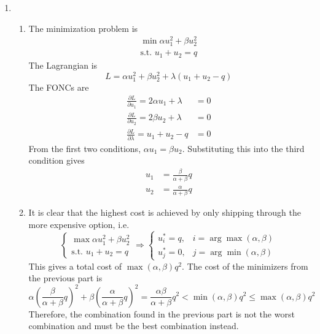 \documentclass[letterpaper,12pt,titlepage]{article}
\newcommand*\pder[2]{\frac{\partial #1}{\partial #2}}
\begin{document}
\begin{enumerate}[leftmargin=0pt]
\item \begin{enumerate}
  \item The minimization problem is
    \begin{gather}
      \min \alpha u_1^2 + \beta u_2^2 \\
      \text{s.t. } u_1 + u_2 = q
    \end{gather}
    The Lagrangian is
    \[ L = \alpha u_1^2 + \beta u_2^2 + \lambda(u_1+u_2-q) \]
    The FONCs are
    \begin{align}
      \pder{L}{u_1} = 2\alpha u_1 + \lambda &= 0 \\
      \pder{L}{u_2} = 2\beta u_2 + \lambda &= 0 \\
      \pder{L}{\lambda} = u_1+u_2-q &= 0
    \end{align}
    From the first two conditions, $\alpha u_1 = \beta u_2$. Substituting this into the third condition gives
    \begin{align}
      u_1 &= \frac{\beta}{\alpha+\beta} q \\
      u_2 &= \frac{\alpha}{\alpha+\beta} q
    \end{align}
  \item It is clear that the highest cost is achieved by only shipping through the more expensive option, i.e.
    \[
      \begin{cases}
        \max \alpha u_1^2 + \beta u_2^2 \\
        \text{s.t. } u_1 + u_2 = q
      \end{cases}
      \Longrightarrow
      \begin{cases}
        u^*_i = q, & i = \arg\max(\alpha,\beta) \\
        u^*_j = 0, & j = \arg\min(\alpha,\beta)
      \end{cases}
    \]
    This gives a total cost of $\max(\alpha,\beta)q^2$. The cost of the minimizers from the previous part is
    \[ \alpha \left(\frac{\beta}{\alpha+\beta} q\right)^2 + \beta \left(\frac{\alpha}{\alpha+\beta} q\right)^2 = \frac{\alpha\beta}{\alpha+\beta} q^2 < \min(\alpha,\beta) q^2 \le \max(\alpha,\beta) q^2 \]
    Therefore, the combination found in the previous part is not the worst combination and must be the best combination instead.
  \end{enumerate}


\end{enumerate}
\end{document}
